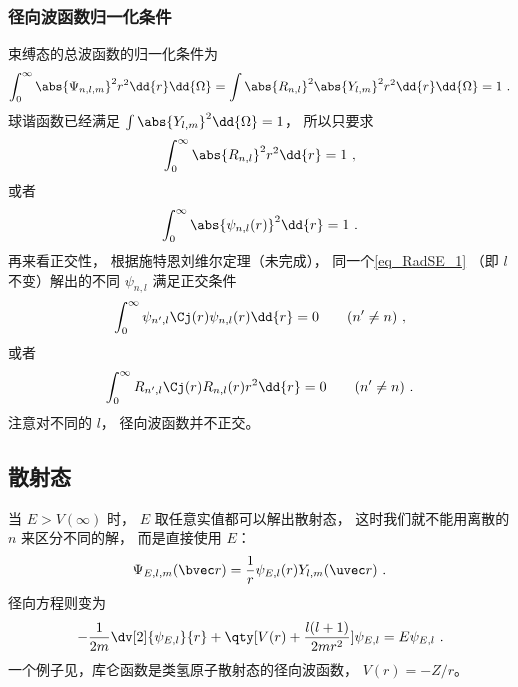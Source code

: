 \subsubsection{径向波函数归一化条件}
束缚态的总波函数的归一化条件为
\begin{equation}
\int_0^\infty \abs{\Psi_{n,l,m}}^2 r^2\dd{r} \dd{\Omega} = \int \abs{R_{n,l}}^2 \abs{Y_{l,m}}^2 r^2\dd{r} \dd{\Omega}  = 1~.
\end{equation}
球谐函数已经满足 $\int \abs{Y_{l,m}}^2 \dd{\Omega} = 1$，  所以只要求
\begin{equation}\label{eq_RadSE_5}
\int_0^\infty \abs{R_{n,l}}^2 r^2 \dd{r}  = 1~,
\end{equation}
或者
\begin{equation}
\int_0^\infty \abs{\psi_{n,l}(r)}^2 \dd{r}  = 1~.
\end{equation}
再来看正交性， 根据施特恩刘维尔定理（未完成）， 同一个\autoref{eq_RadSE_1} （即 $l$ 不变）解出的不同 $\psi_{n,l}$ 满足正交条件
\begin{equation}
\int_0^\infty \psi_{n', l}\Cj(r) \psi_{n,l}(r) \dd{r} = 0 \qquad (n' \ne n)~,
\end{equation}
或者
\begin{equation}\label{eq_RadSE_7}
\int_0^\infty R_{n', l}\Cj(r) R_{n,l}(r) r^2 \dd{r} = 0 \qquad (n' \ne n)~.
\end{equation}
注意对不同的 $l$， 径向波函数并不正交。

\subsection{散射态}
当 $E > V(\infty)$ 时， $E$ 取任意实值都可以解出散射态， 这时我们就不能用离散的 $n$ 来区分不同的解， 而是直接使用 $E$：
\begin{equation}
\Psi_{E, l,m}(\bvec r) = \frac{1}{r}\psi_{E, l}(r) Y_{l,m}(\uvec r)~.
\end{equation}
径向方程则变为
\begin{equation}
-\frac{1}{2m} \dv[2]{\psi_{E, l}}{r} + \qty[V(r) + \frac{l(l + 1)}{2mr^2}]\psi_{E, l} = E \psi_{E, l}~.
\end{equation}
一个例子见，库仑函数是类氢原子散射态的径向波函数， $V(r) = -Z/r$。

